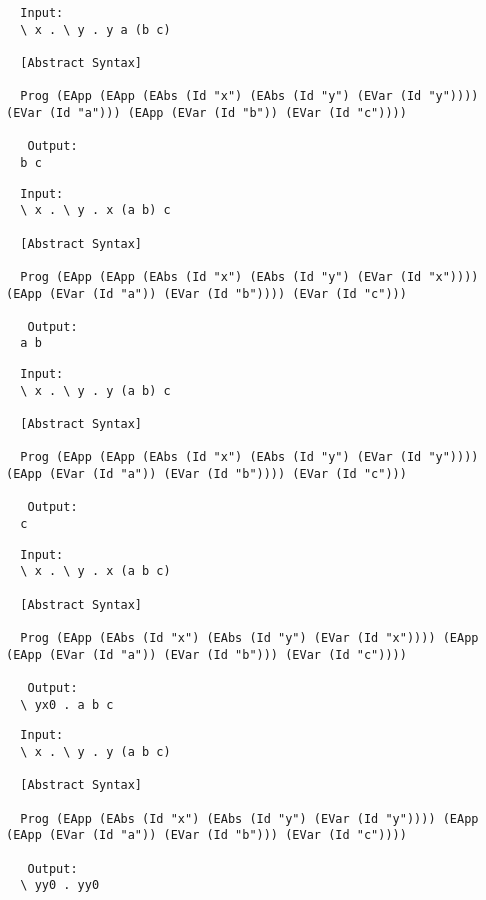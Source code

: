 \documentclass{article}
\theoremstyle{theorem}
\theoremstyle{definition}
\theoremstyle{remark}
\begin{document}
\begin{lstlisting}
  Input:
  \ x . \ y . y a (b c)
  
  [Abstract Syntax]
  
  Prog (EApp (EApp (EAbs (Id "x") (EAbs (Id "y") (EVar (Id "y")))) (EVar (Id "a"))) (EApp (EVar (Id "b")) (EVar (Id "c"))))
  
   Output:
  b c
\end{lstlisting}
\begin{lstlisting}
  Input:
  \ x . \ y . x (a b) c
  
  [Abstract Syntax]
  
  Prog (EApp (EApp (EAbs (Id "x") (EAbs (Id "y") (EVar (Id "x")))) (EApp (EVar (Id "a")) (EVar (Id "b")))) (EVar (Id "c")))
  
   Output:
  a b
\end{lstlisting}
\begin{lstlisting}
  Input:
  \ x . \ y . y (a b) c
  
  [Abstract Syntax]
  
  Prog (EApp (EApp (EAbs (Id "x") (EAbs (Id "y") (EVar (Id "y")))) (EApp (EVar (Id "a")) (EVar (Id "b")))) (EVar (Id "c")))
  
   Output:
  c
\end{lstlisting}
\begin{lstlisting}
  Input:
  \ x . \ y . x (a b c)
  
  [Abstract Syntax]
  
  Prog (EApp (EAbs (Id "x") (EAbs (Id "y") (EVar (Id "x")))) (EApp (EApp (EVar (Id "a")) (EVar (Id "b"))) (EVar (Id "c"))))
  
   Output:
  \ yx0 . a b c
\end{lstlisting}
\begin{lstlisting}
  Input:
  \ x . \ y . y (a b c)
  
  [Abstract Syntax]
  
  Prog (EApp (EAbs (Id "x") (EAbs (Id "y") (EVar (Id "y")))) (EApp (EApp (EVar (Id "a")) (EVar (Id "b"))) (EVar (Id "c"))))
  
   Output:
  \ yy0 . yy0
\end{lstlisting}
\end{document}
